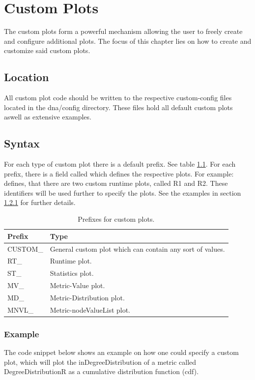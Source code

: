 \chapter{Custom Plots}
\label{sec:customplots}
The custom plots form a powerful mechanism allowing the user to freely create and configure additional plots. The focus of this chapter lies on how to create and customize said custom plots.

\section{Location}
All custom plot code should be written to the respective custom-config files located in the dna/config directory. These files hold all default custom plots aswell as extensive examples.

\section{Syntax}
For each type of custom plot there is a default prefix. See table \ref{tab:prefixes}. For each prefix, there is a field called 
which defines the respective plots. For example:
defines, that there are two custom runtime plots, called R1 and R2. These identifiers will be used further to specify the plots. See the examples in section \ref{sec:example} for further details.

\begin{table}[h]
\centering
\begin{tabular}[h]{|l|l|}\hline
	\textbf{Prefix} & \textbf{Type}\\
	\hline
	CUSTOM\_ & General custom plot which can contain any sort of values.\\
	\hline
	RT\_ & Runtime plot.\\
	\hline
	ST\_ & Statistics plot.\\
	\hline
	MV\_ & Metric-Value plot.\\
	\hline
	MD\_ & Metric-Distribution plot.\\
	\hline
	MNVL\_ & Metric-nodeValueList plot.\\
	\hline
\end{tabular}
\caption{Prefixes for custom plots.}
\label{tab:prefixes}
\end{table}

\subsection{Example}
\label{sec:example}
The code snippet below shows an example on how one could specify a custom plot, which will plot the inDegreeDistribution of a metric called DegreeDistributionR as a cumulative distribution function (cdf). 

